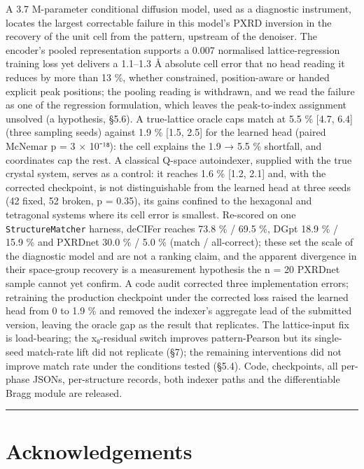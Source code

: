 \documentclass[
  11pt,
]{article}
\begin{document}
A 3.7 M-parameter conditional diffusion model, used as a diagnostic
instrument, locates the largest correctable failure in this model's PXRD
inversion in the recovery of the unit cell from the pattern, upstream of
the denoiser. The encoder's pooled representation supports a 0.007
normalised lattice-regression training loss yet delivers a 1.1--1.3 Å
absolute cell error that no head reading it reduces by more than 13 \%,
whether constrained, position-aware or handed explicit peak positions;
the pooling reading is withdrawn, and we read the failure as one of the
regression formulation, which leaves the peak-to-index assignment
unsolved (a hypothesis, §5.6). A true-lattice oracle caps match at 5.5
\% {[}4.7, 6.4{]} (three sampling seeds) against 1.9 \% {[}1.5, 2.5{]}
for the learned head (paired McNemar p = 3 × 10⁻¹⁸): the cell explains
the 1.9 → 5.5 \% shortfall, and coordinates cap the rest. A classical
Q-space autoindexer, supplied with the true crystal system, serves as a
control: it reaches 1.6 \% {[}1.2, 2.1{]} and, with the corrected
checkpoint, is not distinguishable from the learned head at three seeds
(42 fixed, 52 broken, p = 0.35), its gains confined to the hexagonal and
tetragonal systems where its cell error is smallest. Re-scored on one
\texttt{StructureMatcher} harness, deCIFer reaches 73.8 \% / 69.5 \%,
DGpt 18.9 \% / 15.9 \% and PXRDnet 30.0 \% / 5.0 \% (match /
all-correct); these set the scale of the diagnostic model and are not a
ranking claim, and the apparent divergence in their space-group recovery
is a measurement hypothesis the n = 20 PXRDnet sample cannot yet
confirm. A code audit corrected three implementation errors; retraining
the production checkpoint under the corrected loss raised the learned
head from 0 to 1.9 \% and removed the indexer's aggregate lead of the
submitted version, leaving the oracle gap as the result that replicates.
The lattice-input fix is load-bearing; the x₀-residual switch improves
pattern-Pearson but its single-seed match-rate lift did not replicate
(§7); the remaining interventions did not improve match rate under the
conditions tested (§5.4). Code, checkpoints, all per-phase JSONs,
per-structure records, both indexer paths and the differentiable Bragg
module are released.

\begin{center}\rule{0.5\linewidth}{0.5pt}\end{center}

\section{Acknowledgements}\label{acknowledgements}
\end{document}
